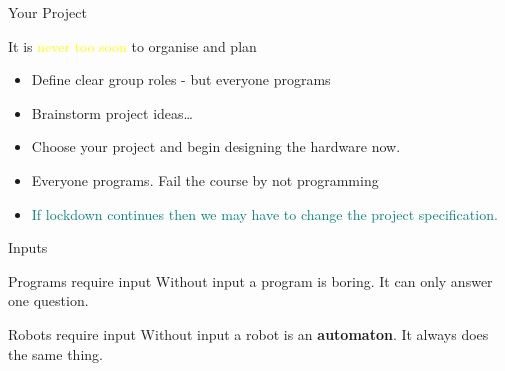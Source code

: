 \documentclass[color=pdftex,usenames,dvipsnames, aspectratio=169]{beamer}
\begin{document}
\begin{frame}{Your Project}
\begin{block}{It is \textcolor{yellow}{never too soon} to organise and plan}
\begin{itemize}
\item Define clear group roles - but everyone programs
\item Brainstorm project ideas\dots
\item Choose your project and begin designing the hardware now.
\item Everyone programs.  Fail the course by not programming
\item \textcolor{teal}{If lockdown continues then we may have to change the project specification.}
\end{itemize}
\end{block}
\end{frame}


\begin{frame}{Inputs}
\begin{block}{Programs require input}
Without input a program is boring. It can only answer one question.
\end{block}
\pause
\begin{block}{Robots require input}
Without input a robot is an \textbf{automaton}.  It always does the same thing.
\end{block}
\end{frame}
\end{document}
